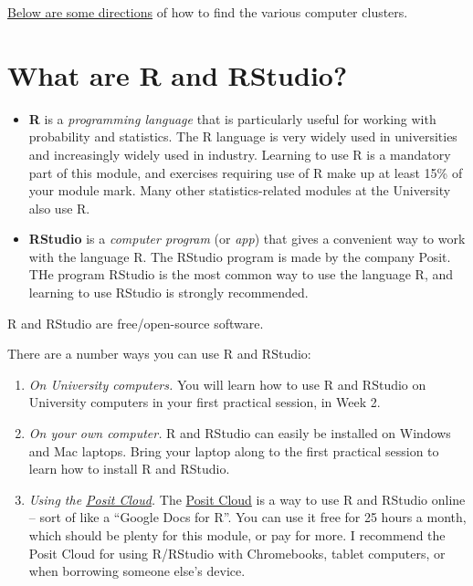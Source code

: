 \documentclass[
  a4paper,
]{book}
\providecommand{\tightlist}{%
  \setlength{\itemsep}{0pt}\setlength{\parskip}{0pt}}
\theoremstyle{definition}
\theoremstyle{definition}
\theoremstyle{definition}
\theoremstyle{definition}
\theoremstyle{remark}
\begin{document}
\protect\hyperlink{directions}{Below are some directions} of how to find the various computer clusters.

\hypertarget{what-is-r}{%
\section*{What are R and RStudio?}\label{what-is-r}}

\begin{itemize}
\tightlist
\item
  \textbf{R} is a \emph{programming language} that is particularly useful for working with probability and statistics. The R language is very widely used in universities and increasingly widely used in industry. Learning to use R is a mandatory part of this module, and exercises requiring use of R make up at least 15\% of your module mark. Many other statistics-related modules at the University also use R.
\item
  \textbf{RStudio} is a \emph{computer program} (or \emph{app}) that gives a convenient way to work with the language R. The RStudio program is made by the company Posit. THe program RStudio is the most common way to use the language R, and learning to use RStudio is strongly recommended.
\end{itemize}

R and RStudio are free/open-source software.

There are a number ways you can use R and RStudio:

\begin{enumerate}
\def\labelenumi{\arabic{enumi}.}
\tightlist
\item
  \emph{On University computers.} You will learn how to use R and RStudio on University computers in your first practical session, in Week 2.
\item
  \emph{On your own computer.} R and RStudio can easily be installed on Windows and Mac laptops. Bring your laptop along to the first practical session to learn how to install R and RStudio.
\item
  \emph{Using the \href{https://posit.cloud}{Posit Cloud}.} The \href{https://posit.cloud}{Posit Cloud} is a way to use R and RStudio online -- sort of like a ``Google Docs for R''. You can use it free for 25 hours a month, which should be plenty for this module, or pay for more. I recommend the Posit Cloud for using R/RStudio with Chromebooks, tablet computers, or when borrowing someone else's device.
\end{enumerate}
\end{document}
